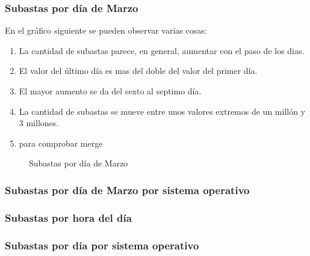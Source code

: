 \documentclass{article}
\newcommand\tab[1][1cm]{\hspace*{#1}}
\begin{document}
	\subsubsection{Subastas por día de Marzo}
	\tab En el gráfico siguiente se pueden observar varias cosas:
	\begin{enumerate}
		\item La cantidad de subastas parece, en general, aumentar con el paso de los dias.
		\item El valor del último día es mas del doble del valor del primer día.
		\item El mayor aumento se da del sexto al septimo día.
		\item La cantidad de subastas se mueve entre unos valores extremos de un millón y 3 millones.
		\item para comprobar merge
	\end{enumerate}
			\begin{figure}
		    	\centering
		    	\caption{Subastas por día de Marzo}
			\end{figure}
	\subsubsection{Subastas por día de Marzo por sistema operativo}
	\subsubsection{Subastas por hora del día}
	\subsubsection{Subastas por día por sistema operativo}
\end{document}
